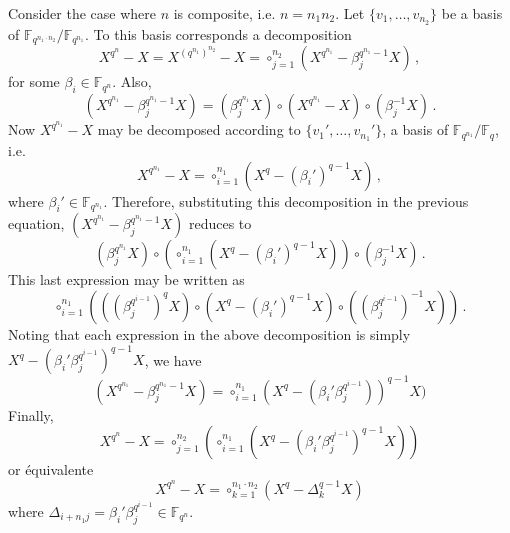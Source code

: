\documentclass{sig-alternate}
\newcommand{\ff}[1]{\mathbb{F}_{#1}}
\newcommand{\qq}{q}
\newcommand{\nn}{n}
\newcommand{\qn}{{\qq^\nn}}
\newcommand{\basef}{\ff{\qq}}
\newcommand{\extf}{\ff{\qn}}
\begin{document}
 
 Consider the case where $\nn$ is composite, i.e. $n=n_1n_2$. Let $\{v_1,\ldots,v_{n_2}\}$ be a basis of $\mathbb{F}_{\qq^{n_1 \cdot n_2}}/\mathbb{F}_{\qq^{n_1}}$. To this basis corresponds a decomposition
\begin{equation}
\label{decomp_n2}
X^{\qq^\nn}-X=X^{(\qq^{n_1})^{n_2}}-X=\circ_{j=1}^{n_2} (X^{\qq^{n_1}}-\beta_j^{\qq^{n_1}-1} X)\,,
\end{equation}
for some $\beta_i \in \extf$.
Also,  
\begin{equation}
\label{basic_decomp}
(X^{\qq^{n_1}}-\beta_j^{\qq^{n_1}-1} X)= (\beta_j^{\qq^{n_1}} X) \circ (X^{\qq^{n_1}}-X)\circ(\beta_j^{-1}X)\,.
\end{equation}
Now $X^{\qq^{n_1}}-X$ may be decomposed according to  $\{v_1',\ldots,v_{n_1}'\}$, a basis of $\mathbb{F}_{\qq^{n_1}}/\basef$, i.e.
\begin{equation}
\label{decomp_basef}
X^{\qq^{n_1}}-X=\circ_{i=1}^{n_1} (X^{\qq}-(\beta_i')^{\qq-1} X)\,,
\end{equation}
where $\beta_i' \in \mathbb{F}_{\qq^{n_1}}$. Therefore, substituting this decomposition in the previous equation, $(X^{\qq^{n_1}}-\beta_j^{\qq^{n_1}-1} X)$ reduces to 
$$(\beta_j^{\qq^{n_1}} X) \circ    \left(    \circ_{i=1}^{n_1} (X^{\qq}  -(\beta_i')^{\qq-1}    X)  \right) \circ(\beta_j^{-1}X)\,.$$
This last expression may be written as
$$\circ_{i=1}^{n_1} \left( ((\beta_j^{\qq^{i-1}})^\qq X) \circ  (X^{\qq}- (\beta_i')^{\qq-1}    X) \circ   ((\beta_j^{\qq^{i-1}})^{-1}X)  \right)\,.$$ 
Noting that each expression in the above decomposition is simply $X^\qq-(  \beta_i'  \beta_j^{\qq^{i-1}})^{q-1}  X$, we have
\begin{equation}
\label{decomp_partial}
(X^{\qq^{n_1}}- \beta_j^{\qq^{n_1}-1} X)=\circ_{i=1}^{n_1} (X^\qq-(\beta_i' \beta_j^{\qq^{i-1}}) )^{q-1} X)
\end{equation}
Finally,
\begin{equation}
\label{decomp_total}
X^{\qq^\nn}-X=\circ_{j=1}^{n_2} \left( \circ_{i=1}^{n_1} (X^\qq-(\beta_i'  \beta_j^{\qq^{i-1}})^{q-1}   X) \right)
\end{equation}
or équivalente
$$
X^{\qq^n}-X=\circ_{k=1}^{n_1 \cdot n_2} (X^q-\Delta_k^{q-1} X)
$$
where $\Delta_{i+n_1 j}=\beta_i'  \beta_j^{\qq^{i-1}} \in \extf$.
\medskip
\end{document}
